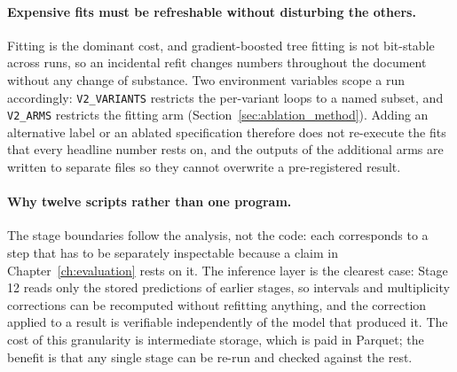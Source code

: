 \paragraph{Expensive fits must be refreshable without disturbing the others.}
Fitting is the dominant cost, and gradient-boosted tree fitting is not
bit-stable across runs, so an incidental refit changes numbers throughout the
document without any change of substance. Two environment variables scope a run
accordingly: \texttt{V2\_VARIANTS} restricts the per-variant loops to a named
subset, and \texttt{V2\_ARMS} restricts the fitting arm
(Section~\ref{sec:ablation_method}). Adding an alternative label or an ablated
specification therefore does not re-execute the fits that every headline number
rests on, and the outputs of the additional arms are written to separate files
so they cannot overwrite a pre-registered result.

\paragraph{Why twelve scripts rather than one program.} The stage boundaries
follow the analysis, not the code: each corresponds to a step that has to be
separately inspectable because a claim in Chapter~\ref{ch:evaluation} rests on
it. The inference layer is the clearest case: Stage 12 reads only the stored
predictions of earlier stages, so intervals and multiplicity corrections can be
recomputed without refitting anything, and the correction applied to a result is
verifiable independently of the model that produced it. The cost of this
granularity is intermediate storage, which is paid in Parquet; the benefit is
that any single stage can be re-run and checked against the rest.

